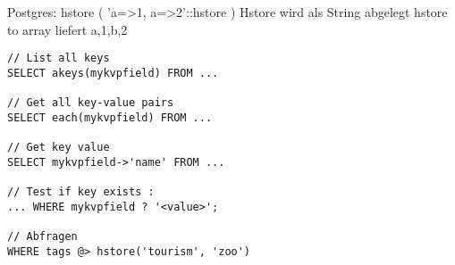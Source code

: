 \documentclass[ngerman,a4paper,12pt]{scrreprt}
\begin{document}

\ul
	\li Postgres: hstore ( 'a=>1, a=>2'::hstore )
	\li Hstore wird als String abgelegt
	\li hstore to array liefert {a,1,b,2}
\ulE

\begin{verbatim}
// List all keys
SELECT akeys(mykvpfield) FROM ...

// Get all key-value pairs
SELECT each(mykvpfield) FROM ...

// Get key value
SELECT mykvpfield->'name' FROM ...

// Test if key exists :
... WHERE mykvpfield ? '<value>';

// Abfragen
WHERE tags @> hstore('tourism', 'zoo')
\end{verbatim}
\end{document}
